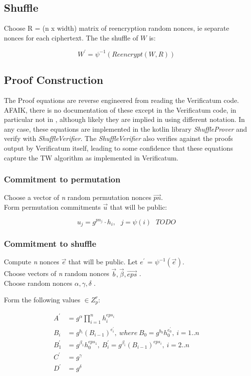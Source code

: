 \documentclass{article}
\begin{document}
\subsection{Shuffle}

Choose R = (n x width) matrix of reencryption random nonces, ie separate
nonces for each ciphertext. The the shuffle of $W$ is:

\[
W^{\prime} = \psi^{-1}(Reencrypt(W, R))
\]


\subsection{Proof Construction}

The Proof equations are reverse engineered from reading the Verificatum
code. AFAIK, there is no documentation of these except in the Verificatum
code, in particular not in \cite{Wikstr22}, although likely they are implied
in \cite{Wikstr10} using different notation. In any case, these equations
are implemented in the kotlin library \emph{ShuffleProver} and verify
with \emph{ShuffleVerifier}. The \emph{ShuffleVerifier} also verifies
against the proofs output by Verificatum itself, leading to some confidence
that these equations capture the TW algorithm as implemented in Verificatum.


\subsubsection{Commitment to permutation}

Choose a vector of \emph{n} random permutation nonces $\vec{pn}$.\\
 Form permutation commitments $\vec{u}$ that will be public:

\[
u_{j}=g^{pn_{j}}\cdot h_{i},\ \ \ j=\psi(i)\ \ \ TODO
\]

\subsubsection{Commitment to shuffle}

Compute \emph{n} nonces $\vec{e}$ that will be public. Let ${e^{\prime}}$
= $\psi^{-1}(\vec{e})$.\\
 Choose vectors of \emph{n} random nonces $\vec{b},\vec{\beta},\vec{eps}$
.\\
 Choose random nonces $\alpha,\gamma,\delta$ .

Form the following values $\in Z_{p}^{r}$:

\begin{align*}
A^{\prime} & =g^{\alpha}\prod_{i=1}^{n}h_{i}^{eps_{i}}\\
B_{i} & =g^{b_{i}}(B_{i-1})^{e_{i}^{\prime}},\ where\ B_{0}=g^{b_0} h_0^{e_{0}^{\prime}},\ i=1..n\\
B_{1}^{\prime}&=g^{\beta_1} h_0^{eps_1},\ B_{i}^{\prime} =g^{\beta_{i}}(B_{i-1})^{eps_{i}},\ i=2..n\\
C^{\prime} & =g^{\gamma}\\
D^{\prime} & =g^{\delta}\\
\end{align*}
\end{document}
